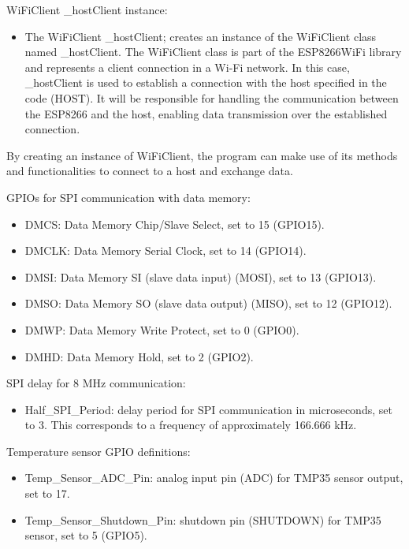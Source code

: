 WiFiClient \_hostClient instance:

\begin{itemize}
    \item The WiFiClient \_hostClient; creates an instance of the WiFiClient class named \_hostClient. The WiFiClient class is part of the 
    ESP8266WiFi library and represents a client connection in a Wi-Fi network. In this case, \_hostClient is used to establish a connection with 
    the host specified in the code (HOST). It will be responsible for handling the communication between the ESP8266 and the host, enabling data 
    transmission over the established connection.
\end{itemize}

By creating an instance of WiFiClient, the program can make use of its methods and functionalities to connect to a host and exchange data.


\noindent GPIOs for SPI communication with data memory:


\begin{itemize}
    \item DMCS: Data Memory Chip/Slave Select, set to 15 (GPIO15).
    \item DMCLK: Data Memory Serial Clock, set to 14 (GPIO14).
    \item DMSI: Data Memory SI (slave data input) (MOSI), set to 13 (GPIO13).
    \item DMSO: Data Memory SO (slave data output) (MISO), set to 12 (GPIO12).
    \item DMWP: Data Memory Write Protect, set to 0 (GPIO0).
    \item DMHD: Data Memory Hold, set to 2 (GPIO2).
\end{itemize}


SPI delay for 8 MHz communication:

\begin{itemize}
    \item Half\_SPI\_Period: delay period for SPI communication in microseconds, set to 3. This corresponds to a frequency of approximately 166.666 kHz.
\end{itemize}

Temperature sensor GPIO definitions:

\begin{itemize}
    \item Temp\_Sensor\_ADC\_Pin: analog input pin (ADC) for TMP35 sensor output, set to 17.
    \item Temp\_Sensor\_Shutdown\_Pin: shutdown pin (SHUTDOWN) for TMP35 sensor, set to 5 (GPIO5).
\end{itemize}


